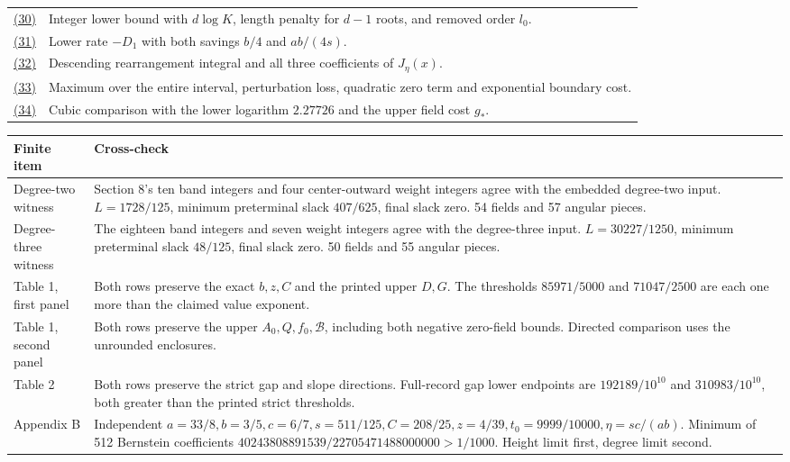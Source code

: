 \documentclass[11pt,a4paper]{article}
\newcounter{none}
\providecommand{\real}[1]{#1}
\begin{document}
{{\begin{longtable}[]{@{}
  >{\raggedright\arraybackslash}p{(\linewidth - 2\tabcolsep) * \real{0.22}}
  >{\raggedright\arraybackslash}p{(\linewidth - 2\tabcolsep) * \real{0.78}}@{}}
\hyperref[eq:30]{(30)} & Integer lower bound with \(d\log K\), length penalty for \(d-1\) roots, and removed order \(l_0\). \\
\hyperref[eq:31]{(31)} & Lower rate \(-D_1\) with both savings \(b/4\) and \(ab/(4s)\). \\
\hyperref[eq:32]{(32)} & Descending rearrangement integral and all three coefficients of \(J_\eta(x)\). \\
\hyperref[eq:33]{(33)} & Maximum over the entire interval, perturbation loss, quadratic zero term and exponential boundary cost. \\
\hyperref[eq:34]{(34)} & Cubic comparison with the lower logarithm \(2.27726\) and the upper field cost \(g_*\). \\
\end{longtable}
}
}

{\def\LTcaptype{none} %
{\small
\begin{longtable}[]{@{}
  >{\raggedright\arraybackslash}p{(\linewidth - 2\tabcolsep) * \real{0.22}}
  >{\raggedright\arraybackslash}p{(\linewidth - 2\tabcolsep) * \real{0.78}}@{}}
\toprule\noalign{}
\begin{minipage}[b]{\linewidth}\raggedright
Finite item
\end{minipage} & \begin{minipage}[b]{\linewidth}\raggedright
Cross-check
\end{minipage} \\
\midrule\noalign{}
\endhead
\bottomrule\noalign{}
\endlastfoot
Degree-two witness & Section 8's ten band integers and four center-outward weight integers agree with the embedded degree-two input. \(L=1728/125\), minimum preterminal slack \(407/625\), final slack zero. 54 fields and 57 angular pieces. \\
Degree-three witness & The eighteen band integers and seven weight integers agree with the degree-three input. \(L=30227/1250\), minimum preterminal slack \(48/125\), final slack zero. 50 fields and 55 angular pieces. \\
Table 1, first panel & Both rows preserve the exact \(b,z,C\) and the printed upper \(D,G\). The thresholds \(85971/5000\) and \(71047/2500\) are each one more than the claimed value exponent. \\
Table 1, second panel & Both rows preserve the upper \(A_0,Q,f_0,\mathcal B\), including both negative zero-field bounds. Directed comparison uses the unrounded enclosures. \\
Table 2 & Both rows preserve the strict gap and slope directions. Full-record gap lower endpoints are \(192189/10^{10}\) and \(310983/10^{10}\), both greater than the printed strict thresholds. \\
Appendix B & Independent \(a=33/8,b=3/5,c=6/7,s=511/125,C=208/25,z=4/39,t_0=9999/10000,\eta=sc/(ab)\). Minimum of 512 Bernstein coefficients \(40243808891539/22705471488000000>1/1000\). Height limit first, degree limit second. \\
\end{longtable}
}
}
\end{document}
